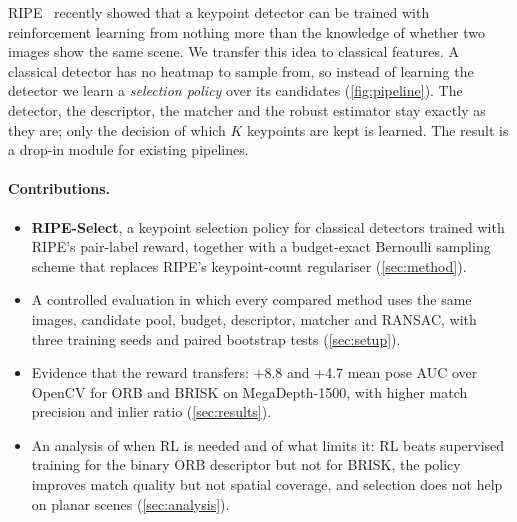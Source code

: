 \documentclass[10pt,twocolumn,letterpaper]{article}
\begin{document}
RIPE~\cite{kunzel2025ripe} recently showed that a keypoint detector can be trained with reinforcement
learning from nothing more than the knowledge of whether two images show the same scene. We transfer
this idea to classical features. A classical detector has no heatmap to sample from, so instead of
learning the detector we learn a \emph{selection policy} over its candidates (\cref{fig:pipeline}). The
detector, the descriptor, the matcher and the robust estimator stay exactly as they are; only the
decision of which $K$ keypoints are kept is learned. The result is a drop-in module for existing
pipelines.

\paragraph{Contributions.}
\begin{itemize}\setlength\itemsep{0pt}
  \item \textbf{RIPE-Select}, a keypoint selection policy for classical detectors trained with RIPE's
        pair-label reward, together with a budget-exact Bernoulli sampling scheme that replaces RIPE's
        keypoint-count regulariser (\cref{sec:method}).
  \item A controlled evaluation in which every compared method uses the same images, candidate pool,
        budget, descriptor, matcher and RANSAC, with three training seeds and paired bootstrap tests
        (\cref{sec:setup}).
  \item Evidence that the reward transfers: +8.8 and +4.7 mean pose AUC over OpenCV for ORB and BRISK on
        MegaDepth-1500, with higher match precision and inlier ratio (\cref{sec:results}).
  \item An analysis of when RL is needed and of what limits it: RL beats supervised training for the
        binary ORB descriptor but not for BRISK, the policy improves match quality but not spatial
        coverage, and selection does not help on planar scenes (\cref{sec:analysis}).
\end{itemize}
\end{document}
